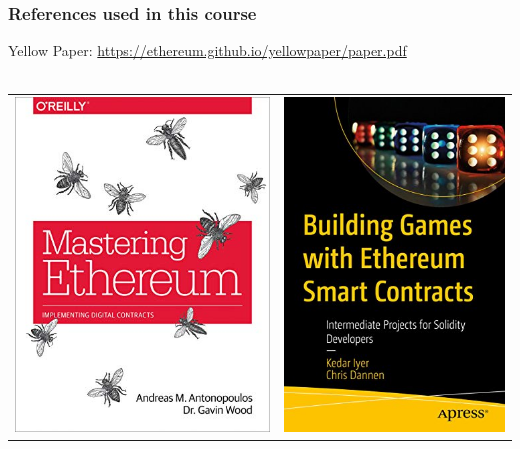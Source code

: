 \documentclass[11pt]{beamer}  %
\begin{document}
\begin{frame}\frametitle{References used in this course}

  \begin{center}
    Yellow Paper: \url{https://ethereum.github.io/yellowpaper/paper.pdf}\\
    \mbox{}\\
    \begin{tabular}{c@{\hskip 1.5cm}c}
      \includegraphics[scale=.3,clip=false]{pictures/mastering-ethereum.jpg} &
      \includegraphics[scale=.3,clip=false]{pictures/building-games.jpg}
    \end{tabular}
  \end{center}


\end{frame}
\end{document}
